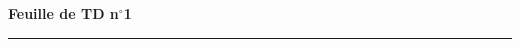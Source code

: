 \documentclass[11pt,a4paper]{article}
\title{}
\date{}
\newcommand{\HRule}{\rule{\linewidth}{0.5mm}}
\begin{document}
\pagestyle{fancy}

\fancyhead{}
 \fancyfoot{}


\newcommand{\lb}{\llbracket}
\newcommand{\rb}{\rrbracket}


\newcommand{\md}[3]{#1\ \equiv \ #2 \! \! \! \! \! \pmod {#3} }
\newcommand{\nmd}[3]{#1 \not \equiv #2 \! \! \! \! \!  \pmod {#3} }
\newcommand{\mda}[3]{#1 \equiv #2 \! \!  \pmod {#3} }
\newcommand{\nmda}[3]{#1 \not \equiv #2 \! \! \pmod {#3} }
\newcommand{\mo}[2]{#1 \! \! \! \! \! \pmod #2 }
\newcommand{\moa}[2]{#1 \! \!  \pmod #2 }


\thispagestyle{fancy}

\begin{center}
    { \huge \bfseries
    Feuille de TD n$^{\boldsymbol{\circ}}$1
     \\ [0cm] }
    \HRule \\[0.5cm]
\end{center}
\
\end{document}
